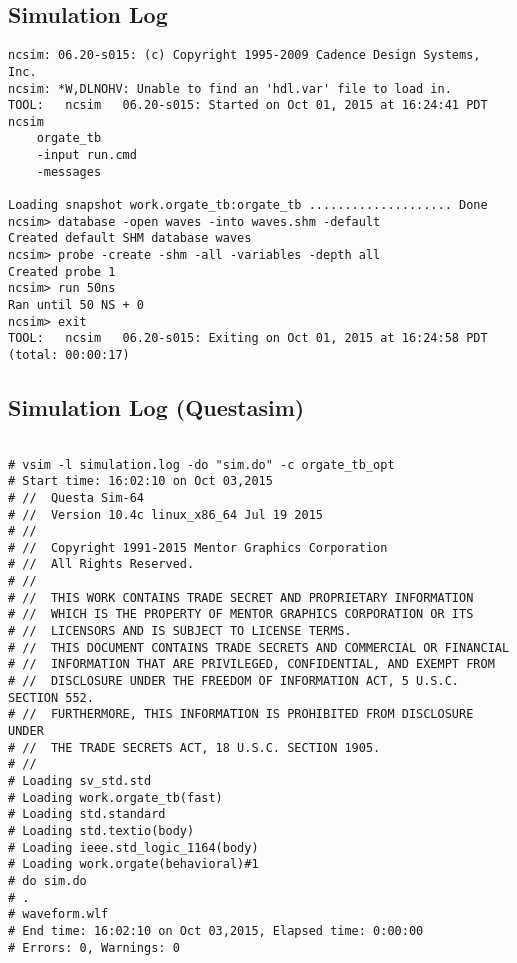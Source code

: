 \documentclass[paper=letter, fontsize=11pt]{scrartcl} %
\numberwithin{equation}{section} %
\numberwithin{figure}{section} %
\numberwithin{table}{section} %
\begin{document}
\subsection{Simulation Log}

\begin{verbatim}
ncsim: 06.20-s015: (c) Copyright 1995-2009 Cadence Design Systems, Inc.
ncsim: *W,DLNOHV: Unable to find an 'hdl.var' file to load in.
TOOL:	ncsim	06.20-s015: Started on Oct 01, 2015 at 16:24:41 PDT
ncsim
    orgate_tb
    -input run.cmd
    -messages

Loading snapshot work.orgate_tb:orgate_tb .................... Done
ncsim> database -open waves -into waves.shm -default
Created default SHM database waves
ncsim> probe -create -shm -all -variables -depth all
Created probe 1
ncsim> run 50ns
Ran until 50 NS + 0
ncsim> exit
TOOL:	ncsim	06.20-s015: Exiting on Oct 01, 2015 at 16:24:58 PDT  (total: 00:00:17)

\end{verbatim}

\subsection{Simulation Log (Questasim)}

\begin{verbatim}

# vsim -l simulation.log -do "sim.do" -c orgate_tb_opt 
# Start time: 16:02:10 on Oct 03,2015
# //  Questa Sim-64
# //  Version 10.4c linux_x86_64 Jul 19 2015
# //
# //  Copyright 1991-2015 Mentor Graphics Corporation
# //  All Rights Reserved.
# //
# //  THIS WORK CONTAINS TRADE SECRET AND PROPRIETARY INFORMATION
# //  WHICH IS THE PROPERTY OF MENTOR GRAPHICS CORPORATION OR ITS
# //  LICENSORS AND IS SUBJECT TO LICENSE TERMS.
# //  THIS DOCUMENT CONTAINS TRADE SECRETS AND COMMERCIAL OR FINANCIAL
# //  INFORMATION THAT ARE PRIVILEGED, CONFIDENTIAL, AND EXEMPT FROM
# //  DISCLOSURE UNDER THE FREEDOM OF INFORMATION ACT, 5 U.S.C. SECTION 552.
# //  FURTHERMORE, THIS INFORMATION IS PROHIBITED FROM DISCLOSURE UNDER
# //  THE TRADE SECRETS ACT, 18 U.S.C. SECTION 1905.
# //
# Loading sv_std.std
# Loading work.orgate_tb(fast)
# Loading std.standard
# Loading std.textio(body)
# Loading ieee.std_logic_1164(body)
# Loading work.orgate(behavioral)#1
# do sim.do
# .
# waveform.wlf
# End time: 16:02:10 on Oct 03,2015, Elapsed time: 0:00:00
# Errors: 0, Warnings: 0

\end{verbatim}
\end{document}
